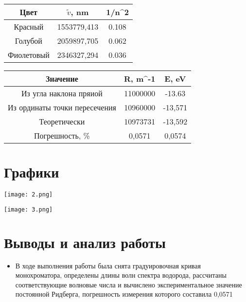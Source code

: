 \documentclass[12pt, a4paper]{article}
\begin{document}
\begin{tabular}{|c|c|c|}
     \hline Цвет & $\tilde{v}$, nm & 1/n^2 \\
     \hline Красный & 1553779,413 & 0.108\\
     \hline Голубой & 2059897,705 & 0.062 \\
     \hline Фиолетовый & 2346327,294 & 0.036 \\
     \hline
\end{tabular}

\begin{tabular}{|c|c|c|}
     \hline Значение & R, m^{-1} & E, eV \\
     \hline Из угла наклона пряиой & 11000000 & -13.63 \\
     \hline Из ординаты точки пересечения & 10960000 & -13,571 \\
     \hline Теоретически & 10973731 & -13,592 \\
     \hline Погрешность, \% & 0,0571 & 0,0574 \\
     \hline
\end{tabular}

\section{Графики}

\texttt{[image: 2.png]}

\texttt{[image: 3.png]}


\section{Выводы и анализ работы}

\begin{itemize}
    \item В ходе выполнения работы была снята градуировочная кривая монохроматора, определены длины волн спектра водорода, рассчитаны соответствующие волновые числа и вычислено экспериментальное значение постоянной Ридберга, погрешность измерения которого составила 0,0571%
\end{itemize}
\end{document}
